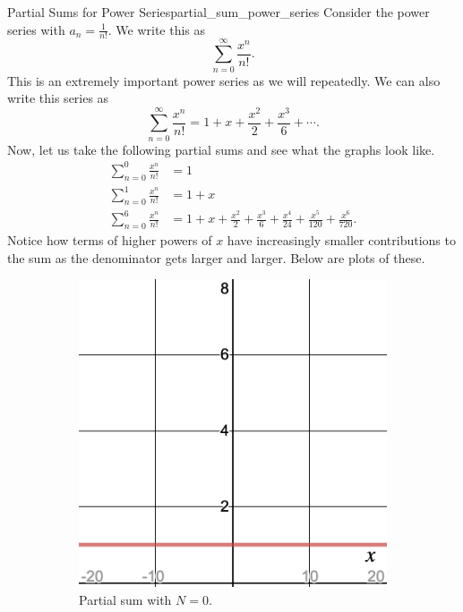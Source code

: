 \begin{ex}{Partial Sums for Power Series}{partial_sum_power_series}
Consider the power series with $a_n = \frac{1}{n!}$. We write this as
\[
\sum_{n=0}^\infty \frac{x^n}{n!}.
\]
This is an extremely important power series as we will repeatedly.  We can also write this series as
\[
\sum_{n=0}^\infty \frac{x^n}{n!} = 1 + x + \frac{x^2}{2}+\frac{x^3}{6}+\cdots.
\]
Now, let us take the following partial sums and see what the graphs look like.
\begin{align*}
    \sum_{n=0}^0 \frac{x^n}{n!} &= 1\\
    \sum_{n=0}^1 \frac{x^n}{n!} &= 1+x\\
    \sum_{n=0}^6 \frac{x^n}{n!} &= 1+x+\frac{x^2}{2}+\frac{x^3}{6}+\frac{x^4}{24}+\frac{x^5}{120}+\frac{x^6}{720}.
\end{align*}
Notice how terms of higher powers of $x$ have increasingly smaller contributions to the sum as the denominator gets larger and larger. Below are plots of these.
\begin{figure}[H]
\centering
    \begin{subfigure}[h]{.3\textwidth}
        \includegraphics[width=\textwidth]{Figures_Part_3/ex_powseries_N=0.png}
        \caption{Partial sum with $N=0$.}
    \end{subfigure}
    ~
    \begin{subfigure}[h]{.3\textwidth}

\end{subfigure}
\end{figure}
\end{ex}
